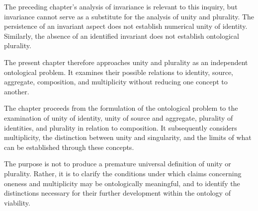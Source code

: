 The preceding chapter's analysis of invariance is relevant
to this inquiry, but invariance cannot serve as a substitute
for the analysis of unity and plurality. The persistence
of an invariant aspect does not establish numerical
unity of identity. Similarly, the absence of an identified
invariant does not establish ontological plurality.

The present chapter therefore approaches unity and
plurality as an independent ontological problem. It
examines their possible relations to identity, source,
aggregate, composition, and multiplicity without reducing
one concept to another.

The chapter proceeds from the formulation of the
ontological problem to the examination of unity of
identity, unity of source and aggregate, plurality of
identities, and plurality in relation to composition.
It subsequently considers multiplicity, the distinction
between unity and singularity, and the limits of what
can be established through these concepts.

The purpose is not to produce a premature universal
definition of unity or plurality. Rather, it is to clarify
the conditions under which claims concerning oneness
and multiplicity may be ontologically meaningful,
and to identify the distinctions necessary for their
further development within the ontology of viability.











